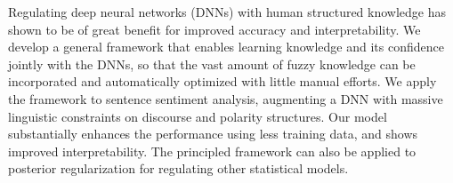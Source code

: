 Regulating deep neural networks (DNNs) with human structured knowledge has shown to be of great benefit for improved accuracy and interpretability. We develop a general framework that enables learning knowledge and its confidence jointly with the DNNs, so that the vast amount of fuzzy knowledge can be incorporated and automatically optimized with little manual efforts. We apply the framework to sentence sentiment analysis, augmenting a DNN with massive linguistic constraints on discourse and polarity structures. Our model substantially enhances the performance using less training data, and shows improved interpretability. The principled framework can also be applied to posterior regularization for regulating other statistical models.
